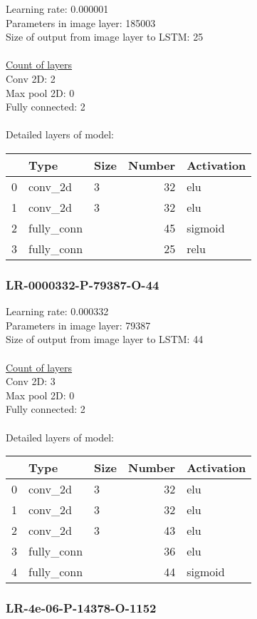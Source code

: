 Learning rate: 0.000001
\\Parameters in image layer: 185003
\\Size of output from image layer to LSTM: 25
\\\\\underline{Count of layers} 
\\Conv 2D:           2\\Max pool 2D:      0\\Fully connected:  2
\\\\Detailed layers of model: \\\begin{tabular}{rllrl}
\hline
    & Type       & Size   &   Number & Activation   \\
\hline
  0 & conv\_2d    & 3      &       32 & elu          \\
  1 & conv\_2d    & 3      &       32 & elu          \\
  2 & fully\_conn &        &       45 & sigmoid      \\
  3 & fully\_conn &        &       25 & relu         \\
\hline
\end{tabular}\subsubsection*{LR-0000332-P-79387-O-44}
Learning rate: 0.000332
\\Parameters in image layer: 79387
\\Size of output from image layer to LSTM: 44
\\\\\underline{Count of layers} 
\\Conv 2D:           3\\Max pool 2D:      0\\Fully connected:  2
\\\\Detailed layers of model: \\\begin{tabular}{rllrl}
\hline
    & Type       & Size   &   Number & Activation   \\
\hline
  0 & conv\_2d    & 3      &       32 & elu          \\
  1 & conv\_2d    & 3      &       32 & elu          \\
  2 & conv\_2d    & 3      &       43 & elu          \\
  3 & fully\_conn &        &       36 & elu          \\
  4 & fully\_conn &        &       44 & sigmoid      \\
\hline
\end{tabular}\subsubsection*{LR-4e-06-P-14378-O-1152}
